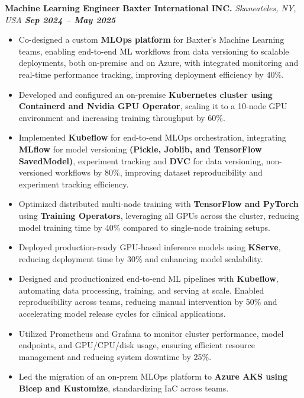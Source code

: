 \documentclass[10pt,letter]{article}
\newcommand{\boldlarger}[1]{\textbf{\normalsize #1}}
\begin{document}
\boldlarger{Machine Learning Engineer} \hfill \boldlarger{Baxter International INC.} \hspace{-2em} \hfill \textit{Skaneateles, NY, USA \hspace{1em} \boldlarger{Sep 2024 -- May 2025}}\\
\vspace{-16pt}
\begin{itemize}
\item Co-designed a custom \textbf{MLOps platform} for Baxter's Machine Learning teams, enabling end-to-end ML workflows from data versioning to scalable deployments, both on-premise and on Azure, with integrated monitoring and real-time performance tracking, improving deployment efficiency by 40\%.
\item Developed and configured an on-premise \textbf{Kubernetes cluster using Containerd and Nvidia GPU Operator}, scaling it to a 10-node GPU environment and increasing training throughput by 60\%.
\item Implemented \textbf{Kubeflow} for end-to-end MLOps orchestration, integrating \textbf{MLflow} for model versioning \textbf{(Pickle, Joblib, and TensorFlow SavedModel)}, experiment tracking and \textbf{DVC} for data versioning, non-versioned workflows by 80\%, improving dataset reproducibility and experiment tracking efficiency.
\item Optimized distributed multi-node training with \textbf{TensorFlow and PyTorch} using \textbf{Training Operators}, leveraging all GPUs across the cluster, reducing model training time by 40\% compared to single-node training setups.
\item Deployed production-ready GPU-based inference models using \textbf{KServe}, reducing deployment time by 30\% and enhancing model scalability.
\item Designed and productionized end-to-end ML pipelines with \textbf{Kubeflow}, automating data processing, training, and serving at scale. Enabled reproducibility across teams, reducing manual intervention by 50\% and accelerating model release cycles for clinical applications.
\item Utilized Prometheus and Grafana to monitor cluster performance, model endpoints, and GPU/CPU/disk usage, ensuring efficient resource management
and reducing system downtime by 25\%.
\item Led the migration of an on-prem MLOps platform to \textbf{Azure AKS using Bicep and Kustomize}, standardizing IaC across teams.
\end{itemize}
\vspace{-6pt}
\end{document}
